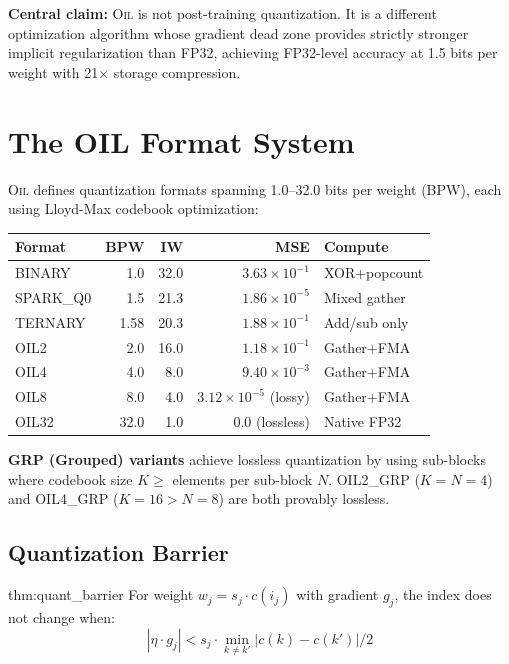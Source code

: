 \documentclass[11pt,a4paper]{article}
\theoremstyle{definition}
\newcommand{\OIL}{\textsc{Oil}}
\begin{document}
\textbf{Central claim:} \OIL{} is not post-training quantization. It is a different optimization algorithm whose gradient dead zone provides strictly stronger implicit regularization than FP32, achieving FP32-level accuracy at 1.5 bits per weight with 21$\times$ storage compression.


\section{The OIL Format System}
\label{sec:formats}

\OIL{} defines quantization formats spanning 1.0--32.0 bits per weight (BPW), each using Lloyd-Max codebook optimization:

\begin{center}
\begin{tabular}{lrrrl}
\toprule
\textbf{Format} & \textbf{BPW} & \textbf{IW} & \textbf{MSE} & \textbf{Compute} \\
\midrule
BINARY & 1.0 & 32.0 & $3.63 \times 10^{-1}$ & XOR+popcount \\
SPARK\_Q0 & 1.5 & 21.3 & $1.86 \times 10^{-5}$ & Mixed gather \\
TERNARY & 1.58 & 20.3 & $1.88 \times 10^{-1}$ & Add/sub only \\
OIL2 & 2.0 & 16.0 & $1.18 \times 10^{-1}$ & Gather+FMA \\
OIL4 & 4.0 & 8.0 & $9.40 \times 10^{-3}$ & Gather+FMA \\
OIL8 & 8.0 & 4.0 & $3.12 \times 10^{-5}$ (lossy) & Gather+FMA \\
OIL32 & 32.0 & 1.0 & 0.0 (lossless) & Native FP32 \\
\bottomrule
\end{tabular}
\end{center}

\textbf{GRP (Grouped) variants} achieve lossless quantization by using sub-blocks where codebook size $K \geq$ elements per sub-block $N$. OIL2\_GRP ($K = N = 4$) and OIL4\_GRP ($K = 16 > N = 8$) are both provably lossless.

\subsection{Quantization Barrier}

\begin{mythm}{thm:quant_barrier}
For weight $w_j = s_j \cdot c(i_j)$ with gradient $g_j$, the index does not change when:
\[
|\eta \cdot g_j| < s_j \cdot \min_{k \neq k'} |c(k) - c(k')| / 2
\]
\end{mythm}
\end{document}
